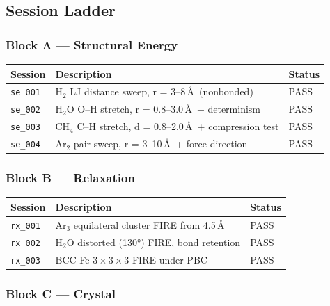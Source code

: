 \documentclass[11pt]{article}
\begin{document}
\subsection{Session Ladder}

\subsubsection{Block A --- Structural Energy}

\begin{center}
\begin{tabular}{lll}
\toprule
Session & Description & Status \\
\midrule
\texttt{se\_001} & H$_2$ LJ distance sweep, r = 3--8\,\AA\ (nonbonded) & PASS \\
\texttt{se\_002} & H$_2$O O--H stretch, r = 0.8--3.0\,\AA\ + determinism & PASS \\
\texttt{se\_003} & CH$_4$ C--H stretch, d = 0.8--2.0\,\AA\ + compression test & PASS \\
\texttt{se\_004} & Ar$_2$ pair sweep, r = 3--10\,\AA\ + force direction & PASS \\
\bottomrule
\end{tabular}
\end{center}

\subsubsection{Block B --- Relaxation}

\begin{center}
\begin{tabular}{lll}
\toprule
Session & Description & Status \\
\midrule
\texttt{rx\_001} & Ar$_3$ equilateral cluster FIRE from 4.5\,\AA\ & PASS \\
\texttt{rx\_002} & H$_2$O distorted (130°) FIRE, bond retention & PASS \\
\texttt{rx\_003} & BCC Fe $3\!\times\!3\!\times\!3$ FIRE under PBC & PASS \\
\bottomrule
\end{tabular}
\end{center}

\subsubsection{Block C --- Crystal}
\end{document}
